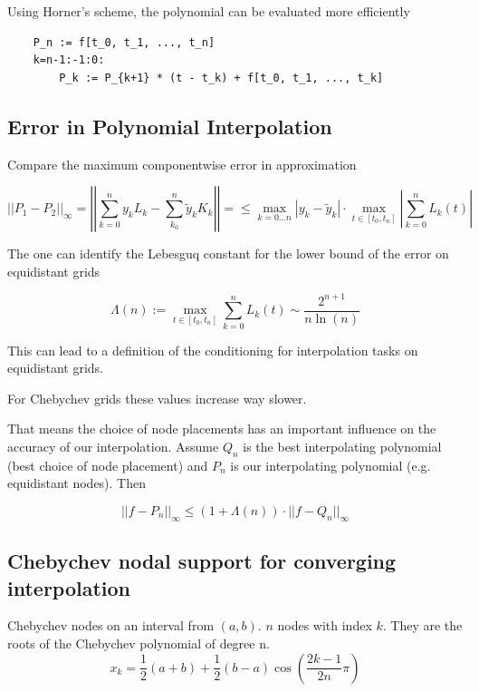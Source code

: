 \documentclass[
    a4paper,
    11pt
]{article}
\begin{document}
Using Horner's scheme, the polynomial can be evaluated more efficiently
\begin{verbatim}
    P_n := f[t_0, t_1, ..., t_n]
    k=n-1:-1:0:
        P_k := P_{k+1} * (t - t_k) + f[t_0, t_1, ..., t_k]
\end{verbatim}

\subsection{Error in Polynomial Interpolation}

Compare the maximum componentwise error in approximation

\begin{equation}
    ||P_1 - P_2||_{\infty} = \left|\left| \sum_{k=0}^n y_k L_k - \sum_{k_0}^n
    \tilde{y}_k K_k \right|\right| =
    \leq \max_{k=0 \dots n} | y_k - \tilde{y}_k| \cdot \max_{t \in [t_0, t_n]}
    \left| \sum_{k=0}^n L_k(t) \right|
\end{equation}

The one can identify the Lebesguq constant for the lower bound of the error on
equidistant grids

\begin{equation}
    \Lambda(n) := \max_{t \in [t_0, t_n]} \sum_{k=0}^n L_k(t)
    \sim \frac{2^{n+1}}{n \ln(n)}
\end{equation}

This can lead to a definition of the conditioning for interpolation tasks on
equidistant grids.

For Chebychev grids these values increase way slower.

That means the choice of node placements has an important influence on the
accuracy of our interpolation. Assume $Q_n$ is the best interpolating
polynomial (best choice of node placement) and $P_n$ is our interpolating
polynomial (e.g. equidistant nodes). Then

\begin{equation}
    ||f - P_n||_{\infty} \leq (1 + \Lambda(n)) \cdot ||f - Q_n||_{\infty}
\end{equation}


\subsection{Chebychev nodal support for converging interpolation}

Chebychev nodes on an interval from $(a,b)$. $n$ nodes with index $k$. They are
the roots of the Chebychev polynomial of degree n.
\begin{equation}
    x_k = \frac{1}{2}(a+b) + \frac{1}{2}(b-a)\cos(\frac{2k-1}{2n}\pi)
\end{equation}
\end{document}
